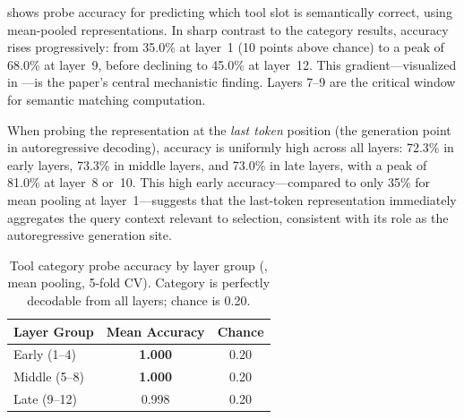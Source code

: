  shows probe accuracy for predicting which tool slot
is semantically correct, using mean-pooled representations.  In sharp contrast to the
category results, accuracy rises progressively: from 35.0\% at layer~1 (10 points above
chance) to a peak of 68.0\% at layer~9, before declining to 45.0\% at layer~12.  This
gradient---visualized in ---is the paper's central mechanistic finding.
Layers 7--9 are the critical window for semantic matching computation.

When probing the representation at the \emph{last token} position (the generation
point in autoregressive decoding), accuracy is uniformly high across all layers: 72.3\%
in early layers, 73.3\% in middle layers, and 73.0\% in late layers, with a peak of
81.0\% at layer~8 or~10.  This high early accuracy---compared to only 35\% for mean
pooling at layer~1---suggests that the last-token representation immediately aggregates
the query context relevant to selection, consistent with its role as the autoregressive
generation site.

\begin{table}[t]
\centering
\caption{Tool category probe accuracy by layer group (\gpttwo, mean pooling, 5-fold CV).
         Category is perfectly decodable from all layers; chance is 0.20.}
\label{tab:probe_category}
\begin{tabular}{@{}lcc@{}}
\toprule
\textbf{Layer Group} & \textbf{Mean Accuracy} & \textbf{Chance} \\
\midrule
Early (1--4)  & \textbf{1.000} & 0.20 \\
Middle (5--8) & \textbf{1.000} & 0.20 \\
Late (9--12)  & 0.998          & 0.20 \\
\bottomrule
\end{tabular}
\end{table}

